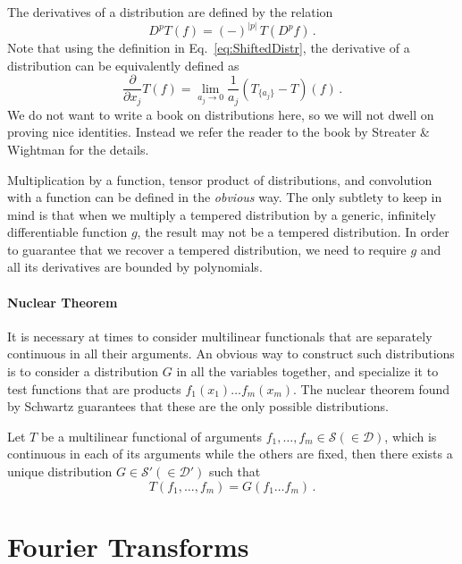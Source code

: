 The derivatives of a distribution are defined by the relation
\begin{equation}
    \label{eq:DistrDeriv}
    D^p T(f) = (-)^{|p|}\, T\left(D^pf\right)\, .
\end{equation}
Note that using the definition in Eq.~\eqref{eq:ShiftedDistr}, the derivative of
a distribution can be equivalently defined as
\begin{equation}
    \label{eq:EquivDerivDef}
    \frac{\partial}{\partial x_j} T (f) =
    \lim _{a_j\to 0} \frac{1}{a_j} \left(T_{\{a_j\}} - T\right)(f)\, .
\end{equation}
We do not want to write a book on distributions here, so we will not dwell on
proving nice identities. Instead we refer the reader to the book by Streater \&
Wightman for the details.  

Multiplication by a function, tensor product of distributions, and convolution
with a function can be defined in the {\em obvious} way. The only subtlety to
keep in mind is that when we multiply a tempered distribution by a generic,
infinitely differentiable function $g$, the result may not be a tempered
distribution. In order to guarantee that we recover a tempered distribution, we
need to require $g$ and all its derivatives are bounded by polynomials. 

\paragraph{Nuclear Theorem}

It is necessary at times to consider multilinear functionals that are separately
continuous in all their arguments. An obvious way to construct such
distributions is to consider a distribution $G$ in all the variables together,
and specialize it to test functions that are products $f_1(x_1) \ldots
f_m(x_m)$. The nuclear theorem found by Schwartz guarantees that these are the
only possible distributions. 
\begin{Thm}
    Let $T$ be a multilinear functional of arguments 
    $f_1, \ldots, f_m \in \mathcal{S} (\in \mathcal{D})$, which is continuous in 
    each of its arguments while the others are fixed, then there exists a unique 
    distribution $G \in \mathcal{S}' (\in \mathcal{D}')$ such that
    \[
        T(f_1, \ldots, f_m) = G(f_1 \ldots f_m)\, .    
    \]
\end{Thm}

\section{Fourier Transforms}
\label{sec:FTDistr}

